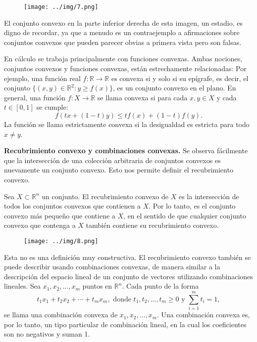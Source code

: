 \documentclass{article}
\begin{document}
\begin{figure}[H] %
\centering %
\texttt{[image: ../img/7.png]} %
\label{fig:imagen} %
\end{figure}

El conjunto convexo en la parte inferior derecha de esta imagen, un estadio, es digno de recordar, ya que a menudo es un contraejemplo a afirmaciones sobre conjuntos convexos que pueden parecer obvias a primera vista pero son falsas.

En cálculo se trabaja principalmente con funciones convexas. Ambas nociones, conjuntos convexos y funciones convexas, están estrechamente relacionadas: Por ejemplo, una función real \( f: \mathbb{R} \to \mathbb{R} \) es convexa si y solo si su epígrafe, es decir, el conjunto \( \{(x, y) \in \mathbb{R}^2 : y \geq f(x)\} \), es un conjunto convexo en el plano. En general, una función \( f: X \to \mathbb{R} \) se llama convexa si para cada \( x, y \in X \) y cada \( t \in [0, 1] \) se cumple:
\[
f(tx + (1-t)y) \leq t f(x) + (1-t) f(y).
\]
La función se llama estrictamente convexa si la desigualdad es estricta para todo \( x \neq y \).

\textbf{Recubrimiento convexo y combinaciones convexas.} Se observa fácilmente que la intersección de una colección arbitraria de conjuntos convexos es nuevamente un conjunto convexo. Esto nos permite definir el recubrimiento convexo.

Sea \( X \subset \mathbb{R}^n \) un conjunto. El recubrimiento convexo de \( X \) es la intersección de todos los conjuntos convexos que contienen a \( X \). Por lo tanto, es el conjunto convexo más pequeño que contiene a \( X \), en el sentido de que cualquier conjunto convexo que contenga a \( X \) también contiene su recubrimiento convexo.

\begin{figure}[H] %
\centering %
\texttt{[image: ../img/8.png]} %
\label{fig:imagen} %
\end{figure}

Esta no es una definición muy constructiva. El recubrimiento convexo también se puede describir usando combinaciones convexas, de manera similar a la descripción del espacio lineal de un conjunto de vectores utilizando combinaciones lineales. Sea \( x_1, x_2, \ldots, x_m \) puntos en \( \mathbb{R}^n \). Cada punto de la forma
\[
t_1x_1 + t_2x_2 + \cdots + t_mx_m, \text{ donde } t_1, t_2, \ldots, t_m \geq 0 \text{ y } \sum_{i=1}^m t_i = 1,
\]
se llama una combinación convexa de \( x_1, x_2, \ldots, x_m \). Una combinación convexa es, por lo tanto, un tipo particular de combinación lineal, en la cual los coeficientes son no negativos y suman 1.
\end{document}
